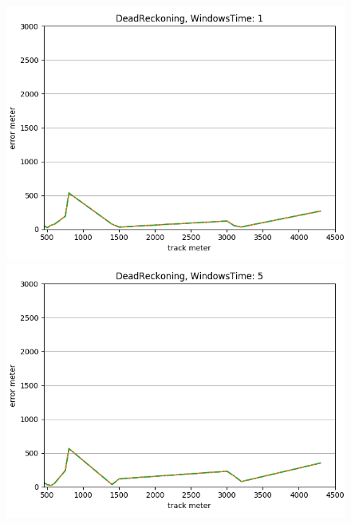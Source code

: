 \documentclass[12pt,a4paper,openright,twoside]{report}
\begin{document}
\begin{figure}[H]
\centering 
\includegraphics[scale=0.4]{thirdChartDeadReckoning-1} 
\includegraphics[scale=0.4]{thirdChartDeadReckoning-5} 
\end{figure}
\end{document}
